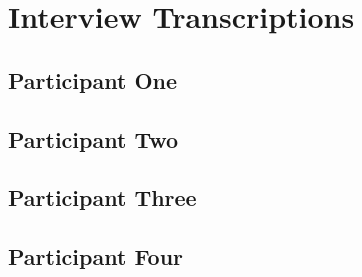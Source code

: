 \chapter{Interview Transcriptions}
\label{appx:transcriptions}
\section{Participant One}


\section{Participant Two}


\section{Participant Three}


\section{Participant Four}


% 

% 
